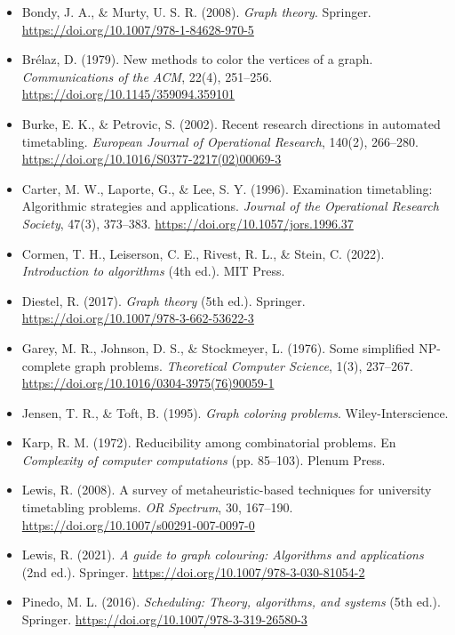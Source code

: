 \documentclass[12pt,a4paper]{article}
\theoremstyle{definition}
\begin{document}
\begin{singlespace}
\scriptsize
\begin{itemize}
    \setlength{\itemsep}{2pt}
    \item[] Bondy, J. A., \& Murty, U. S. R. (2008). \textit{Graph theory}. Springer. \url{https://doi.org/10.1007/978-1-84628-970-5}
    \item[] Brélaz, D. (1979). New methods to color the vertices of a graph. \textit{Communications of the ACM}, 22(4), 251--256. \url{https://doi.org/10.1145/359094.359101}
    \item[] Burke, E. K., \& Petrovic, S. (2002). Recent research directions in automated timetabling. \textit{European Journal of Operational Research}, 140(2), 266--280. \url{https://doi.org/10.1016/S0377-2217(02)00069-3}
    \item[] Carter, M. W., Laporte, G., \& Lee, S. Y. (1996). Examination timetabling: Algorithmic strategies and applications. \textit{Journal of the Operational Research Society}, 47(3), 373--383. \url{https://doi.org/10.1057/jors.1996.37}
    \item[] Cormen, T. H., Leiserson, C. E., Rivest, R. L., \& Stein, C. (2022). \textit{Introduction to algorithms} (4th ed.). MIT Press.
    \item[] Diestel, R. (2017). \textit{Graph theory} (5th ed.). Springer. \url{https://doi.org/10.1007/978-3-662-53622-3}
    \item[] Garey, M. R., Johnson, D. S., \& Stockmeyer, L. (1976). Some simplified NP-complete graph problems. \textit{Theoretical Computer Science}, 1(3), 237--267. \url{https://doi.org/10.1016/0304-3975(76)90059-1}
    \item[] Jensen, T. R., \& Toft, B. (1995). \textit{Graph coloring problems}. Wiley-Interscience.
    \item[] Karp, R. M. (1972). Reducibility among combinatorial problems. En \textit{Complexity of computer computations} (pp. 85--103). Plenum Press.
    \item[] Lewis, R. (2008). A survey of metaheuristic-based techniques for university timetabling problems. \textit{OR Spectrum}, 30, 167--190. \url{https://doi.org/10.1007/s00291-007-0097-0}
    \item[] Lewis, R. (2021). \textit{A guide to graph colouring: Algorithms and applications} (2nd ed.). Springer. \url{https://doi.org/10.1007/978-3-030-81054-2}
    \item[] Pinedo, M. L. (2016). \textit{Scheduling: Theory, algorithms, and systems} (5th ed.). Springer. \url{https://doi.org/10.1007/978-3-319-26580-3}

\end{itemize}
\end{singlespace}
\end{document}
